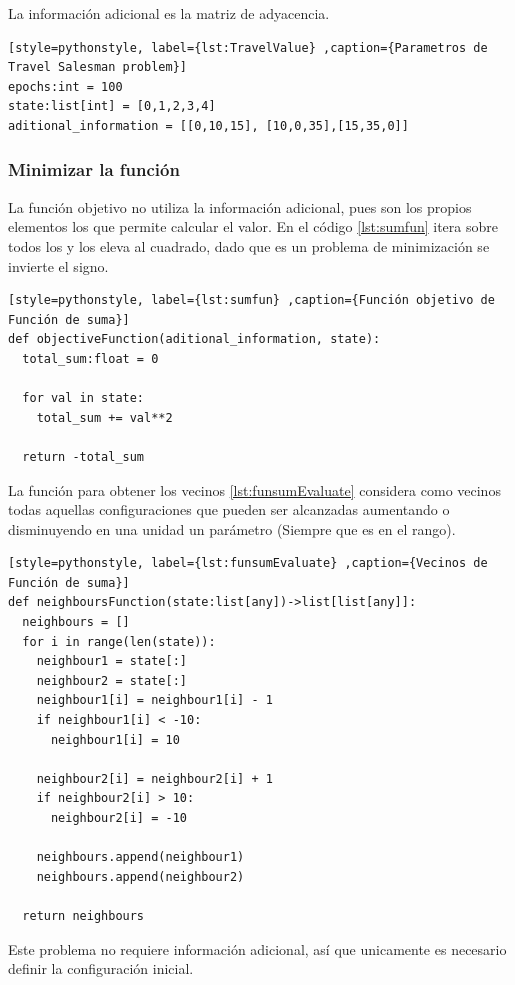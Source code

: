\documentclass[12pt,twoside]{article}
\begin{document}
La información adicional es la matriz de adyacencia.

\begin{lstlisting}[style=pythonstyle, label={lst:TravelValue} ,caption={Parametros de Travel Salesman problem}]
epochs:int = 100
state:list[int] = [0,1,2,3,4]
aditional_information = [[0,10,15], [10,0,35],[15,35,0]] 
\end{lstlisting}

\clearpage
\subsubsection{Minimizar la función}

La función objetivo no utiliza la información adicional, pues son los propios elementos los que permite calcular el valor. En el código \ref{lst:sumfun} itera sobre todos los y los eleva al cuadrado, dado que es un problema de minimización se invierte el signo.

\begin{lstlisting}[style=pythonstyle, label={lst:sumfun} ,caption={Función objetivo de Función de suma}]
def objectiveFunction(aditional_information, state):
  total_sum:float = 0

  for val in state:
    total_sum += val**2

  return -total_sum
\end{lstlisting}

La función para obtener los vecinos \ref{lst:funsumEvaluate} considera como vecinos todas aquellas configuraciones que pueden ser alcanzadas aumentando o disminuyendo en una unidad un parámetro (Siempre que es en el rango).

\begin{lstlisting}[style=pythonstyle, label={lst:funsumEvaluate} ,caption={Vecinos de Función de suma}]
def neighboursFunction(state:list[any])->list[list[any]]:
  neighbours = []
  for i in range(len(state)):
    neighbour1 = state[:]
    neighbour2 = state[:]
    neighbour1[i] = neighbour1[i] - 1
    if neighbour1[i] < -10:
      neighbour1[i] = 10 

    neighbour2[i] = neighbour2[i] + 1
    if neighbour2[i] > 10:
      neighbour2[i] = -10 

    neighbours.append(neighbour1)
    neighbours.append(neighbour2)

  return neighbours
\end{lstlisting}

Este problema no requiere información adicional, así que unicamente es necesario definir la configuración inicial.
\end{document}
